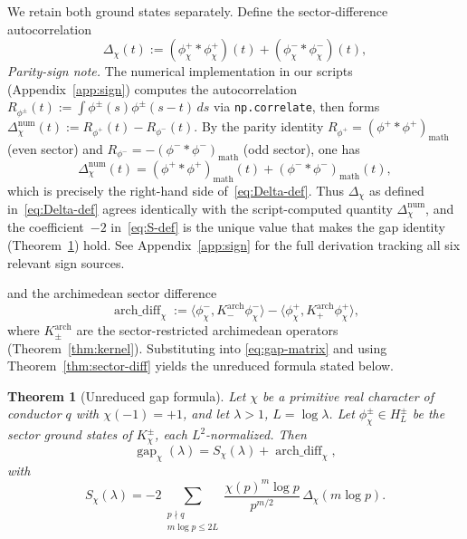 \documentclass[10pt,twocolumn]{article}
\newtheorem{theorem}{Theorem}[section]
\theoremstyle{definition}
\theoremstyle{remark}
\newcommand{\gap}{\operatorname{gap}}
\newcommand{\chifn}{\chi}
\newcommand{\Deltachi}{\Delta_{\chifn}}
\newcommand{\archdiff}{\operatorname{arch\_diff}}
\begin{document}
We retain both ground states separately. Define the sector-difference
autocorrelation
\begin{equation}
\label{eq:Delta-def}
  \Deltachi(t)
    := (\phi^+_{\chifn}\!*\phi^+_{\chifn})(t)
      + (\phi^-_{\chifn}\!*\phi^-_{\chifn})(t),
\end{equation}
\emph{Parity-sign note.} The numerical implementation in our scripts
(Appendix~\ref{app:sign}) computes the autocorrelation
$R_{\phi^\pm}(t):=\int\phi^\pm(s)\phi^\pm(s-t)\,ds$ via
\texttt{np.correlate}, then forms
$\Deltachi^{\mathrm{num}}(t):=R_{\phi^+}(t)-R_{\phi^-}(t)$. By the
parity identity $R_{\phi^+}=(\phi^+{*}\phi^+)_{\mathrm{math}}$
(even sector) and $R_{\phi^-}=-(\phi^-{*}\phi^-)_{\mathrm{math}}$
(odd sector), one has
\[
  \Deltachi^{\mathrm{num}}(t)
    =(\phi^+{*}\phi^+)_{\mathrm{math}}(t)+(\phi^-{*}\phi^-)_{\mathrm{math}}(t),
\]
which is precisely the right-hand side of~\eqref{eq:Delta-def}. Thus
$\Deltachi$ as defined in~\eqref{eq:Delta-def} agrees identically with
the script-computed quantity $\Deltachi^{\mathrm{num}}$, and the
coefficient~$-2$ in~\eqref{eq:S-def} is the unique value that makes
the gap identity (Theorem~\ref{thm:closure}) hold. See
Appendix~\ref{app:sign} for the full derivation tracking all six
relevant sign sources.

and the archimedean sector difference
\begin{equation}
\label{eq:arch-diff-def}
  \archdiff_{\chifn}
    := \langle\phi^-_{\chifn},K^{\mathrm{arch}}_-\phi^-_{\chifn}\rangle
     - \langle\phi^+_{\chifn},K^{\mathrm{arch}}_+\phi^+_{\chifn}\rangle,
\end{equation}
where $K^{\mathrm{arch}}_\pm$ are the sector-restricted archimedean
operators (Theorem~\ref{thm:kernel}). Substituting into
\eqref{eq:gap-matrix} and using Theorem~\ref{thm:sector-diff} yields
the unreduced formula stated below.

\begin{theorem}[Unreduced gap formula]
\label{thm:closure}
Let $\chifn$ be a primitive real character of conductor $q$ with
$\chifn(-1)=+1$, and let $\lambda>1$, $L=\log\lambda$. Let
$\phi^\pm_{\chifn}\in H_L^\pm$ be the sector ground states of
$K_{\chifn}^\pm$, each $L^2$-normalized. Then
\begin{equation}
\label{eq:gap-unreduced}
  \gap_{\chifn}(\lambda)
    = S_{\chifn}(\lambda) + \archdiff_{\chifn},
\end{equation}
with
\begin{equation}
\label{eq:S-def}
  S_{\chifn}(\lambda)
    = -2\sum_{\substack{p\nmid q\\m\log p\leq 2L}}
      \frac{\chifn(p)^m\log p}{p^{m/2}}\,\Deltachi(m\log p).
\end{equation}
\end{theorem}
\end{document}
